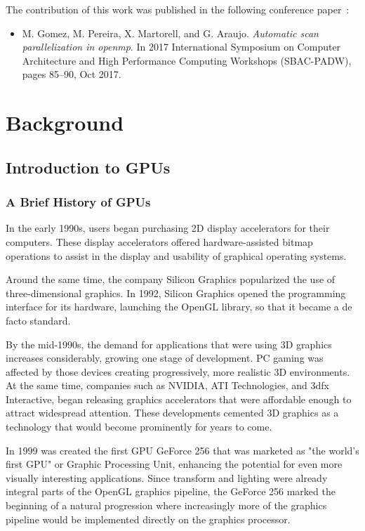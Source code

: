 \documentclass[Ingles]{ic-tese-v1}
\begin{document}
The contribution of this work was published in the following conference paper~\cite{maicol2017}:

\begin{itemize}
  \item M. Gomez, M. Pereira, X. Martorell, and G. Araujo. {\em Automatic scan
    parallelization in openmp}. In 2017 International Symposium on Computer
    Architecture and High Performance Computing Workshops (SBAC-PADW), pages
    85–90, Oct 2017.
\end{itemize}

\chapter{Background}
\label{cap:background}

\section{Introduction to GPUs}
\subsection{A Brief History of GPUs}
In the early 1990s, users began purchasing
2D display accelerators for their computers. These display accelerators
offered hardware-assisted bitmap operations to assist in the display and usability
of graphical operating systems.

Around the same time, the company Silicon Graphics popularized the use
of three-dimensional graphics. In 1992, Silicon Graphics opened the
programming interface for its hardware, launching the OpenGL library, so that it became a de facto standard.

By the mid-1990s, the demand for applications that were using 3D graphics
increases considerably, growing one stage of development. PC gaming was affected
by those devices creating progressively, more realistic 3D environments.
At the same time, companies such as NVIDIA, ATI Technologies,
and 3dfx Interactive, began releasing graphics accelerators that were affordable
enough to attract widespread attention. These developments cemented 3D
graphics as a technology that would become prominently for years to come.

In 1999 was created the first GPU GeForce 256 that was marketed as "the world's
first GPU" or Graphic Processing Unit, enhancing the potential
for even more visually interesting applications. Since transform and lighting were
already integral parts of the OpenGL graphics pipeline, the GeForce 256 marked
the beginning of a natural progression where increasingly more of the graphics
pipeline would be implemented directly on the graphics processor.
\end{document}
